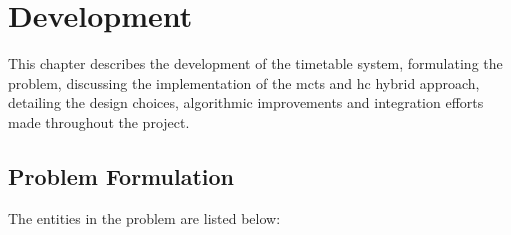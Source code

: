
\chapter{Development}


\label{Development}

This chapter describes the development of the timetable system, formulating the problem, discussing the implementation of the \ac{mcts} and \ac{hc} hybrid approach, detailing the design choices, algorithmic improvements and integration efforts made throughout the project.

\section{Problem Formulation}

The entities in the problem are listed below:

